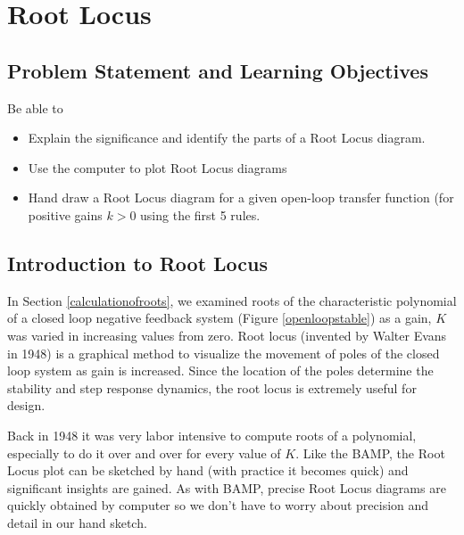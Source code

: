 %
%
%

\chapter{Root Locus}\label{RootLocusChapter}

\section{Problem Statement and Learning Objectives}

Be able to 
\begin{itemize}

  \item Explain the significance and identify the parts of a Root Locus diagram.
  \item Use the computer to plot Root Locus diagrams
  \item Hand draw  a Root Locus diagram for a given open-loop  transfer 
  function (for positive gains  $k>0$ using the first 5 rules. 
\end{itemize}





\section{Introduction to Root Locus}

In Section \ref{calculationofroots}, we examined roots of the characteristic polynomial of a closed loop negative feedback system (Figure \ref{openloopstable}) as a gain, $K$ was varied in increasing values from zero.    Root locus (invented by Walter Evans in 1948) is a graphical method to visualize the movement of poles of the closed loop system as gain is increased.   Since the location of the poles determine the stability  and step response dynamics, the root locus is extremely useful for design.

Back in 1948 it was very labor intensive to compute roots of a polynomial, especially to do it over and over for every value of $K$.   Like the BAMP, the Root Locus plot can be sketched by hand (with practice it becomes quick) and significant insights are gained.   As with BAMP, precise Root Locus diagrams are quickly obtained by computer so we don't have to worry about precision and detail in our hand sketch.









